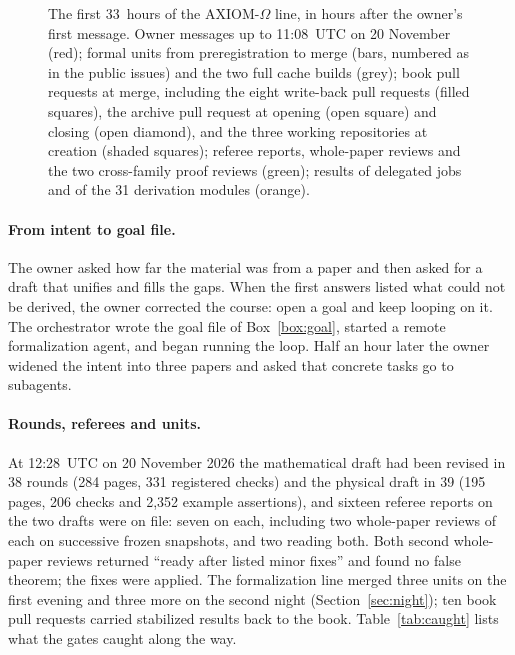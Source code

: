 \documentclass[11pt]{article}
\begin{document}
\begin{figure}[htbp]
\begin{tikzpicture}
\end{tikzpicture}
\caption{The first 33~hours of the AXIOM-$\Omega$ line, in hours after the
owner's first message. Owner messages up to 11:08~UTC on 20 November (red);
formal units from preregistration to merge (bars, numbered as in the public
issues) and the two full cache builds (grey); book pull requests at merge,
including the eight write-back pull requests (filled squares), the archive
pull request at opening (open square) and closing (open diamond), and the
three working repositories at creation (shaded squares); referee reports,
whole-paper reviews and the two cross-family proof reviews (green); results
of delegated jobs and of the 31 derivation modules (orange).}
\label{fig:timeline}
\end{figure}

\paragraph{From intent to goal file.} The owner asked how far the material was from a
paper and then asked for a draft that unifies and fills the gaps. When the
first answers listed what could not be derived, the owner corrected the
course: open a goal and keep looping on it. The orchestrator wrote the goal
file of Box~\ref{box:goal}, started a remote formalization agent, and began
running the loop. Half an hour later the owner widened the intent into three
papers and asked that concrete tasks go to subagents.

\paragraph{Rounds, referees and units.} At 12:28~UTC on 20 November 2026 the
mathematical draft had been revised in 38 rounds (284 pages, 331 registered
checks) and the physical draft in 39 (195 pages, 206 checks and 2{,}352
example assertions), and sixteen referee reports on the two drafts were on
file: seven on each, including two whole-paper reviews of each on successive
frozen snapshots, and two reading both. Both second whole-paper reviews
returned ``ready after listed minor fixes'' and found no false theorem; the
fixes were applied. The formalization line merged three units on the first
evening and three more on the second night (Section~\ref{sec:night}); ten book pull requests
carried stabilized results back to the book. Table~\ref{tab:caught} lists what the gates caught
along the way.
\end{document}
